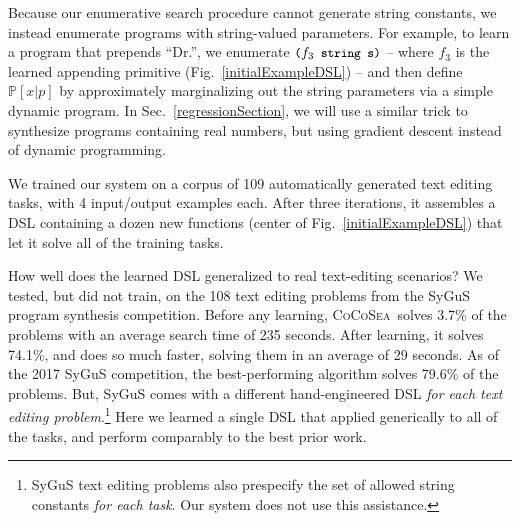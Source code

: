\documentclass{article}
\newcommand{\system}{\textsc{CoCoSea}~}
\newcommand{\code}[1]{{\footnotesize\texttt{#1}}}
\newcommand{\probability}{\mathds{P}} %
\begin{document}
Because our enumerative search procedure cannot generate string
constants, we instead enumerate programs with string-valued
parameters.  For example, to learn a program that prepends ``Dr.'', we
enumerate $\text{\code{(}}f_3\code{ string s)}$ -- where $f_3$ is the
learned appending primitive (Fig.~\ref{initialExampleDSL}) -- and then
define $\probability[x|p]$ by approximately marginalizing out the
string parameters via a simple dynamic program.
In Sec.~\ref{regressionSection}, we will use a similar trick to
synthesize programs containing real numbers, but using gradient
descent instead of dynamic programming.

We trained our system on a corpus of 109 automatically generated text editing tasks, with 4 input/output examples each.
After three iterations, it assembles a DSL containing a dozen new functions (center of Fig.~\ref{initialExampleDSL}) that let it solve 
all of the training tasks.

How well does the  learned DSL generalized to real text-editing scenarios?
We tested, but did not train, on the 108 text editing problems from the SyGuS~\cite{alur2016sygus} program synthesis competition. Before any learning,
\system solves 3.7\% of the problems with an average search time of 235 seconds.
After learning,
it solves 74.1\%, and does so much faster,
solving them in an average of 29 seconds.
As of the 2017 SyGuS competition,
the best-performing algorithm solves 79.6\% of the problems.
But, SyGuS comes with a
different hand-engineered DSL \emph{for each text editing problem}.\footnote{SyGuS text editing problems also prespecify the set of allowed string constants \emph{for each task}. Our system does not use this assistance.}
Here  we learned a single DSL
that applied generically to
all of the tasks,
and perform comparably to the best
prior work.
\end{document}
